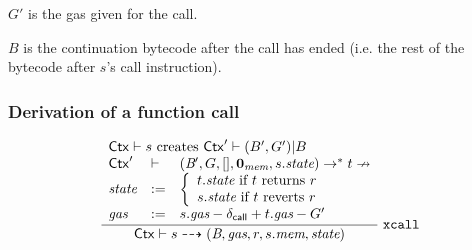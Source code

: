 $G'$ is the gas given for the call. 

$B$ is the continuation bytecode after the call has ended (i.e. the rest of the bytecode after $s$'s call instruction).

\subsubsection{Derivation of a function call}

\begin{table}[ht]
$$
\begin{array}{c}
\dfrac{
    \begin{array}{lll}
    \multicolumn{3}{l}{\textrm{$\ctx\vdash s$ creates $\ctx'\vdash (B',G')|B$}}\\
     \mathsf{\ctx'}&\vdash& 
     (\bytecode{}{}',G,[],\zMem,s.\state) \to^* t \nrightarrow\\
     \state &:=& \left\{
    \begin{array}{l}
        \textrm{$t.\state$ if $t$ returns $r$}\\
        \textrm{$s.\state$ if $t$ reverts $r$}
    \end{array}\right.\\
    \textit{gas} &:=& s.\textit{gas}-\dcl+t.\textit{gas}-G'
    \end{array}
}{
 \ctx
 \vdash
 s
 \rar 
 (\bytecode,\textit{gas},r,s.\textit{mem},
 \state
 )
}\rlab{xcall}
\end{array}
$$
\end{table}

